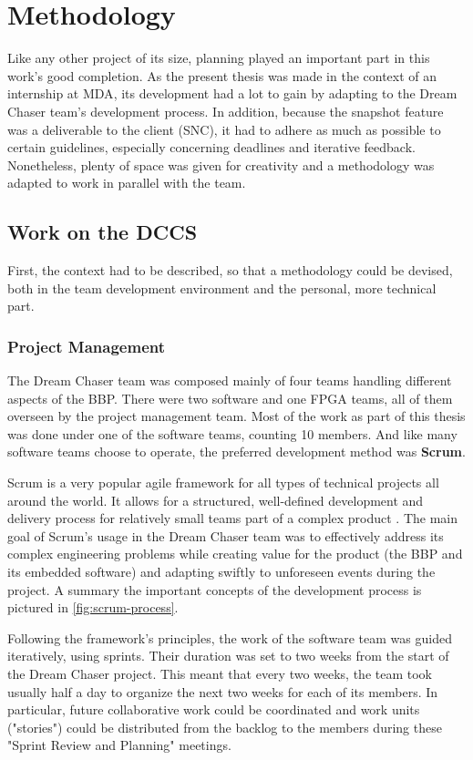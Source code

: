 {
\setlength{\parindent}{2em}
\chapter{Methodology}\label{cha:meth}
Like any other project of its size, planning played an important part in this work's good completion. As the present thesis was made in the context of an internship at \gls{MDA}, its development had a lot to gain by adapting to the Dream Chaser team's development process. In addition, because the snapshot feature was a deliverable to the client (\gls{SNC}), it had to adhere as much as possible to certain guidelines, especially concerning deadlines and iterative feedback. Nonetheless, plenty of space was given for creativity and a methodology was adapted to work in parallel with the team. 

\section{Work on the DCCS}
First, the context had to be described, so that a methodology could be devised, both in the team development environment and the personal, more technical part.

\subsection*{Project Management}
The Dream Chaser team was composed mainly of four teams handling different aspects of the \gls{BBP}. There were two software and one FPGA teams, all of them overseen by the project management team. Most of the work as part of this thesis was done under one of the software teams, counting 10 members. And like many software teams choose to operate, the preferred development method was \textbf{Scrum}. 

Scrum is a very popular agile framework for all types of technical projects all around the world. It allows for a structured, well-defined development and delivery process for relatively small teams part of a complex product \cite{book:scrum}. The main goal of Scrum's usage in the Dream Chaser team was to effectively address its complex engineering problems while creating value for the product (the BBP and its embedded software) and adapting swiftly to unforeseen events during the project. A summary the important concepts of the development process is pictured in \autoref{fig:scrum-process}.

Following the framework's principles, the work of the software team was guided iteratively, using sprints. Their duration was set to two weeks from the start of the Dream Chaser project. This meant that every two weeks, the team took usually half a day to organize the next two weeks for each of its members. In particular, future collaborative work could be coordinated and work units ("stories") could be distributed from the backlog to the members during these "Sprint Review and Planning" meetings.

}
